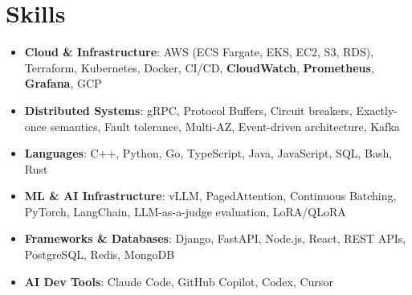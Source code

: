 \documentclass[letterpaper,11pt]{article}
\newcommand{\resumeSubHeadingListStart}{\begin{itemize}[leftmargin=0.15in, label={}]}
\newcommand{\resumeSubHeadingListEnd}{\end{itemize}}
\newcommand{\resumeSkillHeading}[2]{%
  \item\small{\textbf{#1}: #2 \vspace{-9pt}}%
}
\begin{document}
\section{Skills}
  \resumeSubHeadingListStart
    \resumeSkillHeading{Cloud \& Infrastructure}{AWS (ECS Fargate, EKS, EC2, S3, RDS), Terraform, Kubernetes, Docker, CI/CD, \textbf{CloudWatch}, \textbf{Prometheus}, \textbf{Grafana}, GCP}
    \resumeSkillHeading{Distributed Systems}{gRPC, Protocol Buffers, Circuit breakers, Exactly-once semantics, Fault tolerance, Multi-AZ, Event-driven architecture, Kafka}
    \resumeSkillHeading{Languages}{C++, Python, Go, TypeScript, Java, JavaScript, SQL, Bash, Rust}
    \resumeSkillHeading{ML \& AI Infrastructure}{vLLM, PagedAttention, Continuous Batching, PyTorch, LangChain, LLM-as-a-judge evaluation, LoRA/QLoRA}
    \resumeSkillHeading{Frameworks \& Databases}{Django, FastAPI, Node.js, React, REST APIs, PostgreSQL, Redis, MongoDB}
    \resumeSkillHeading{AI Dev Tools}{Claude Code, GitHub Copilot, Codex, Cursor}
  \resumeSubHeadingListEnd
\end{document}
